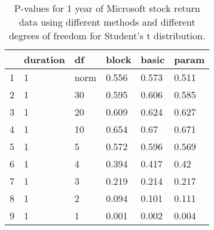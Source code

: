 \begin{table}[ht]
\centering
\caption{P-values for 1 year of Microsoft stock return data using different 
  methods
  and different degrees of freedom for Student's t distribution.} 
\label{table:microsoft1}
\begin{tabular}{rlllll}
  \hline
 & duration & df & block & basic & param \\ 
  \hline
1 & 1 & norm & 0.556 & 0.573 & 0.511 \\ 
  2 & 1 & 30 & 0.595 & 0.606 & 0.585 \\ 
  3 & 1 & 20 & 0.609 & 0.624 & 0.627 \\ 
  4 & 1 & 10 & 0.654 & 0.67 & 0.671 \\ 
  5 & 1 & 5 & 0.572 & 0.596 & 0.569 \\ 
  6 & 1 & 4 & 0.394 & 0.417 & 0.42 \\ 
  7 & 1 & 3 & 0.219 & 0.214 & 0.217 \\ 
  8 & 1 & 2 & 0.094 & 0.101 & 0.111 \\ 
  9 & 1 & 1 & 0.001 & 0.002 & 0.004 \\ 
   \hline
\end{tabular}
\end{table}

